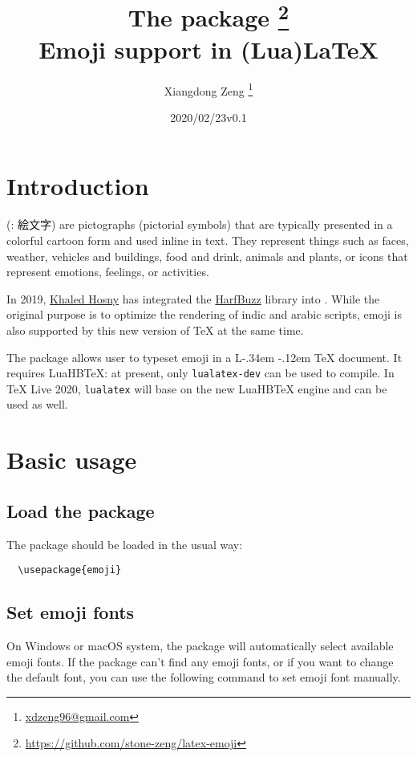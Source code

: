 \documentclass{l3doc}
\title{The \pkg{emoji} package \thanks{\url{https://github.com/stone-zeng/latex-emoji}} \\
  Emoji support in (Lua)\LaTeX}
\author{Xiangdong Zeng \thanks{\url{xdzeng96@gmail.com}}}
\date{\emoji{date} 2020/02/23\quad v0.1}
\DeclareRobustCommand{\LaTeX}{
  L\kern-.34em
  \raisebox{.36ex}{\scalebox{0.9}{\textsc{a}}}
  \kern-.12em
  \TeX}
\def\LuaHBTeX{LuaHB\TeX}
\begin{document}
\maketitle

\tableofcontents

\section{ Introduction}

 (: {\fontja 絵文字}) are pictographs (pictorial symbols) that are
typically presented in a colorful cartoon form and used inline in text. They represent things
such as faces, weather, vehicles and buildings, food and drink, animals and plants, or icons
that represent emotions, feelings, or activities.\textsuperscript{\cite{utr51}}

In 2019, \href{https://github.com/khaledhosny}{Khaled Hosny} has integrated the
\href{https://github.com/harfbuzz/harfbuzz}{HarfBuzz} library into \LuaTeX. While the original
purpose is to optimize the rendering of indic and arabic scripts, emoji is also supported by
this new version of \TeX{} at the same time.

The  package allows user to typeset emoji in a \LaTeX{} document. It requires
\LuaHBTeX{}: at present, only \texttt{lualatex-dev} can be used to compile. In \TeX{} Live 2020,
\texttt{lualatex} will base on the new \LuaHBTeX{} engine and can be used as well.

\section{ Basic usage}

\subsection{ Load the package}

The package should be loaded in the usual way:

\begin{verbatim}
  \usepackage{emoji}
\end{verbatim}

\subsection{ Set emoji fonts}

On Windows or macOS system, the  package will automatically select available emoji
fonts. If the package can't find any emoji fonts, or if you want to change the default font,
you can use the following command to set emoji font manually.
\end{document}
